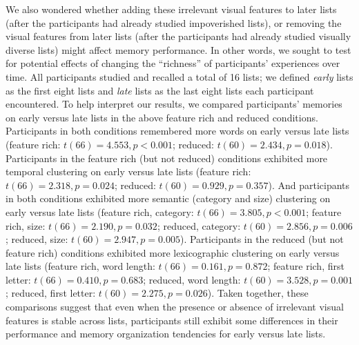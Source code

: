 \documentclass[11pt]{article}
\begin{document}
We also wondered whether adding these irrelevant visual features to later lists
(after the participants had already studied impoverished lists), or removing
the visual features from later lists (after the participants had already
studied visually diverse lists) might affect memory performance. In other
words, we sought to test for potential effects of changing the ``richness'' of
participants' experiences over time. All participants studied and recalled a
total of 16 lists; we defined \textit{early} lists as the first eight lists and
\textit{late} lists as the last eight lists each participant encountered. To
help interpret our results, we compared participants' memories on early versus
late lists in the above feature rich and reduced conditions. Participants in
both conditions remembered more words on early versus late lists (feature rich:
$t(66) = 4.553, p < 0.001$; reduced: $t(60) = 2.434, p = 0.018$). Participants
in the feature rich (but not reduced) conditions exhibited more temporal
clustering on early versus late lists (feature rich: $t(66) = 2.318, p =
0.024$; reduced: $t(60) = 0.929, p = 0.357$). And participants in both
conditions exhibited more semantic (category and size) clustering on early
versus late lists (feature rich, category: $t(66) = 3.805, p < 0.001$; feature
rich, size: $t(66) = 2.190, p = 0.032$; reduced, category: $t(60) = 2.856, p =
0.006$; reduced, size: $t(60) = 2.947, p = 0.005$). Participants in the reduced
(but not feature rich) conditions exhibited more lexicographic clustering on
early versus late lists (feature rich, word length: $t(66) = 0.161, p = 0.872$;
feature rich, first letter: $t(66) = 0.410, p = 0.683$; reduced, word length:
$t(60) = 3.528, p = 0.001$; reduced, first letter: $t(60) = 2.275, p = 0.026$).
Taken together, these comparisons suggest that even when the presence or
absence of irrelevant visual features is stable across lists, participants
still exhibit some differences in their performance and memory organization
tendencies for early versus late lists.
\end{document}
